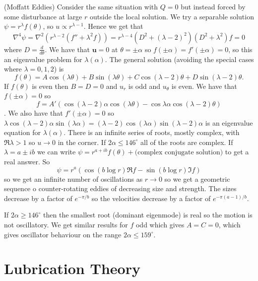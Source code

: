 \documentclass{article}
\begin{document}
\begin{example}
	(Moffatt Eddies) Consider the same situation with $ Q = 0 $ but instead forced by some disturbance at large $ r $ outside the local solution. We try a separable solution $ \psi = r^\lambda f(\theta) $, so $ u\propto r^{\lambda -1} $. Hence we get that 
	\[
		\nabla^4 \psi = \nabla^2(r^{\lambda-2}(f''+\lambda^2 f)) = r^{\lambda -4}(D^2 + (\lambda -2)^2)(D^2 + \lambda^2)f = 0
	\]
	where $ D = \frac d{d\theta} $. We have that $ \mathbf u =0 $ at $ \theta = \pm\alpha $ so $ f(\pm \alpha) = f'(\pm \alpha) = 0 $, so this an eigenvalue problem for $ \lambda(\alpha) $. The general solution (avoiding the special cases where $ \lambda = 0,1,2 $) is
	\[
	  f(\theta) = A\cos(\lambda\theta) + B\sin(\lambda\theta) + C\cos(\lambda -2)\theta + D\sin(\lambda-2)\theta.
	\]
If $ f(\theta) $ is even then $ B=D = 0 $ and $ u_r $ is odd and $ u_\theta $ is even. We have that $ f(\pm \alpha) = 0 $ so \[ f = A'(\cos(\lambda-2)\alpha \cos(\lambda \theta) - \cos\lambda\alpha\cos(\lambda-2)\theta) \].
We also have that $ f'(\pm \alpha) = 0 $ so $ \lambda \cos(\lambda-2)\alpha \sin(\lambda\alpha) = (\lambda-2)\cos(\lambda\alpha)\sin(\lambda -2)\alpha $ is an eigenvalue equation for $ \lambda(\alpha) $. There is an infinite series of roots, mostly complex, with $ \Re \lambda > 1 $ so $ u\to 0 $ in the corner. If $ 2\alpha \le 146^\circ $ all of the roots are complex. If $ \lambda = a \pm ib $ we can write $ \psi = r^{a+ib} f(\theta) + \text{(complex conjugate solution)} $ to get a real answer. So
\[
  \psi = r^a(\cos(b\log r) \Re f-\sin(b\log r) \Im f)
\]
so we get an infinite number of oscillations as $ r\to 0 $ so we get a geometric sequence o counter-rotating eddies of decreasing size and strength. The sizes decrease by a factor of $ e^{-\pi/b} $ so the velocities decrease by a factor of $ e^{-\pi(a-1)/b} $.\par
If $ 2\alpha \ge 146^\circ $ then the smallest root (dominant eigenmode) is real so the motion is not oscillatory. We get similar results for $ f $ odd which gives $ A=C=0 $, which gives oscillator behaviour on the range $ 2\alpha \le 159^\circ $.
\end{example}
\section{Lubrication Theory}
\end{document}

